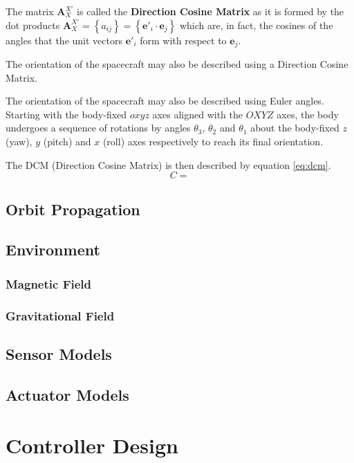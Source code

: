 The matrix $\mathbf{A}_X^{X'}$ is called the \textbf{Direction Cosine Matrix} as it is formed by the dot products $\mathbf{A}_X^{X'} = \left\lbrace a_{ij} \right\rbrace = \left\lbrace \mathbf{e}'_i \cdot \mathbf{e}_j \right\rbrace $ which are, in fact, the cosines of the angles that the unit vectors $\mathbf{e}'_i$ form with respect to $\mathbf{e}_j$.

The orientation of the spacecraft may also be described using a Direction Cosine Matrix.

The orientation of the spacecraft may also be described using Euler angles.
Starting with the body-fixed $oxyz$ axes aligned with the $OXYZ$ axes, the body undergoes a sequence of rotations by angles $\theta_3$, $\theta_2$ and $\theta_1$ about the body-fixed $z$ (yaw), $y$ (pitch) and $x$ (roll) axes respectively to reach its final orientation.

The DCM (Direction Cosine Matrix) is then described by equation \ref{eq:dcm}.
\begin{equation} \label{eq:dcm}
C = 
\end{equation}

\subsection{Orbit Propagation}

\subsection{Environment}
	
\subsubsection{Magnetic Field}
\subsubsection{Gravitational Field}

\subsection{Sensor Models}

\subsection{Actuator Models}

\section{Controller Design}

